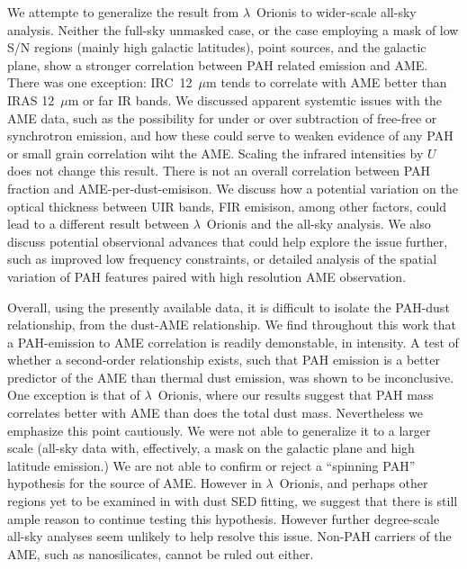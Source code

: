 \documentclass[12pt,a4paper]{article}
\begin{document}
We attempte to generalize the result from $\lambda$~Orionis to wider-scale all-sky analysis. 
Neither the full-sky unmasked case, or the case employing a mask of low S/N regions (mainly high galactic latitudes), point sources, and the galactic plane, show a stronger correlation between PAH related emission and AME. 
There was one exception: IRC~12~$\mu$m tends to correlate with AME better than IRAS 12~$\mu$m or far IR bands. 
We discussed apparent systemtic issues with the AME data, such as the possibility for under or over subtraction of free-free or synchrotron emission, and how these could serve to weaken evidence of any PAH or small grain correlation wiht the AME. 
Scaling the infrared intensities by $U$ does not change this result. 
There is not an overall correlation between PAH fraction and AME-per-dust-emisison. 
We discuss how a potential variation on the optical thickness between UIR bands, FIR emisison, among other factors, could lead to a different result between $\lambda$~Orionis and the all-sky analysis. 
We also discuss potential observional advances that could help explore the issue further, such as improved low frequency constraints, or detailed analysis of the spatial variation of PAH features paired with high resolution AME observation.

Overall, using the presently available data, it is difficult to isolate the PAH-dust relationship, from the dust-AME relationship. 
We find throughout this work that a PAH-emission to AME correlation is readily demonstable, in intensity. 
A test of whether a second-order relationship exists, such that PAH emission is a better predictor of the AME than thermal dust emission, was shown to be inconclusive. 
One exception is that of $\lambda$~Orionis, where our results suggest that PAH mass correlates better with AME than does the total dust mass. Nevertheless we emphasize this point cautiously. 
We were not able to generalize it to a larger scale (all-sky data with, effectively, a mask on the galactic plane and high latitude emission.)  We are not able to confirm or reject a ``spinning PAH'' hypothesis for the source of AME. 
However in $\lambda$~Orionis, and perhaps other regions yet to be examined in with dust SED fitting, we suggest that there is still ample reason to continue testing this hypothesis. 
However further degree-scale all-sky analyses seem unlikely to help resolve this issue. Non-PAH carriers of the AME, such as nanosilicates, cannot be ruled out either.
\end{document}
